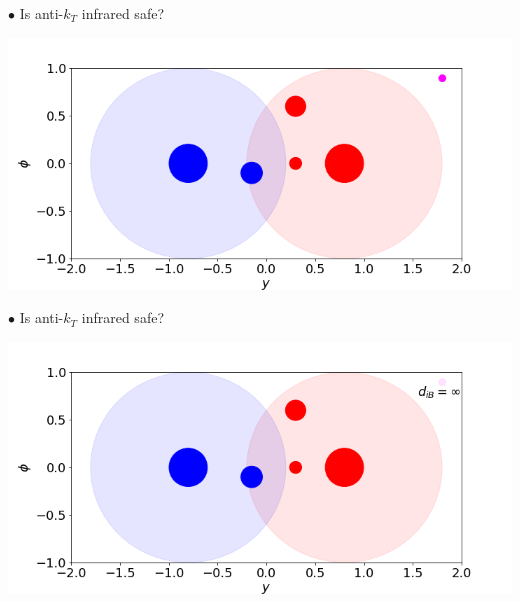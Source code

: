 \documentclass[9pt,a4paper,unknownkeysallowed,xcolor=dvipsnames,aspectratio=43]{beamer}
\begin{document}
\begin{frame}

{\color{darkred}\Large$\bullet$} Is anti-$k_T$ infrared safe?\\
\vspace{2mm}
\begin{center}
\includegraphics[width=\textwidth]{03/antiktSOut.png}
\end{center}
\end{frame}
%
%
\begin{frame}

{\color{darkred}\Large$\bullet$} Is anti-$k_T$ infrared safe?\\
\vspace{2mm}
\begin{center}
\includegraphics[width=\textwidth]{03/antiktSO.png}
\end{center}
\end{frame}
%
%
\end{document}
